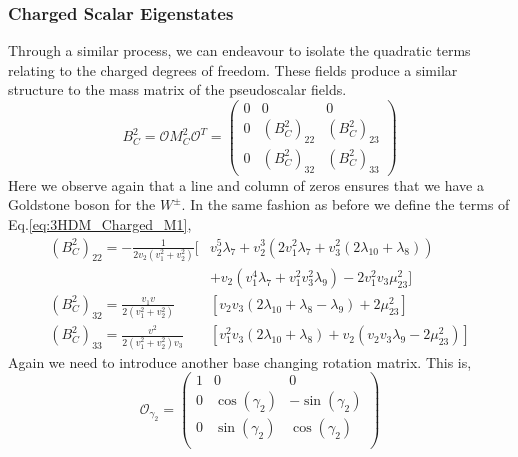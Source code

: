 \subsubsection{Charged Scalar Eigenstates}

Through a similar process, we can endeavour to isolate the quadratic terms relating to the charged degrees of freedom. These fields produce a similar structure to the mass matrix of the pseudoscalar fields.  
%
%
\begin{equation}
\label{eq:3HDM_Charged_M1}
B^2_C = \mathcal{O} M_C^2 \mathcal{O}^T = \left( \begin{array}{ccc}
0 & 0 & 0 \\ 
0 & \left( B^2_C \right)_{22} &  \left( B^2_C \right)_{23} \\
0 & \left( B^2_C \right)_{32} &  \left( B^2_C \right)_{33}
\end{array} \right) 
\end{equation}
%
Here we observe again that a line and column of zeros ensures that we have a Goldstone boson for the $W^\pm$. 
%
In the same fashion as before we define the terms of Eq.\ref{eq:3HDM_Charged_M1}, 
%
%
\begin{equation}
\begin{split}
\left( B^2_C \right)_{22} = - \frac{1}{2v_2 (v_1^2 + v_2^2 ) } \Bigg[ & v_2^5 \lambda_7 + v_2^3 \left( 2 v_1^2 \lambda_7 + v_3^2 \left( 2\lambda_{10} + \lambda_8 \right) \right) \\ & + v_2 \left( v_1^4 \lambda_7 + v_1^2 v_3^2 \lambda_9 \right) - 2 v_1^2 v_3 \mu_{23}^2 \Bigg]   \\ 
%
\left( B^2_C \right)_{32}  = \frac{v_1 v}{ 2 ( v_1^2 + v_2^2 ) } & \left[ v_2 v_3 \left( 2\lambda_{10} + \lambda_8 - \lambda_9 \right) + 2\mu_{23}^2 \right]   \\
\left( B^2_C \right)_{33} = \frac{v^2}{2(v_1^2 +v^2_2)v_3 }
& \left[ v_1^2 v_3 \left( 2 \lambda_{10} + \lambda_8 \right) + v_2 \left( v_2 v_3 \lambda_9 - 2 \mu_{23}^2 \right) \right]   
\end{split} 
\end{equation}
Again we need to introduce another base changing rotation matrix. 
%
This is, 
\begin{equation}
\mathcal{O}_{\gamma_2} = \begin{pmatrix}
1 & 0 & 0 \\
0 & \cos(\gamma_2) & -\sin(\gamma_2) \\ 
0 & \sin(\gamma_2) & \cos(\gamma_2) \\
\end{pmatrix}
\end{equation}
